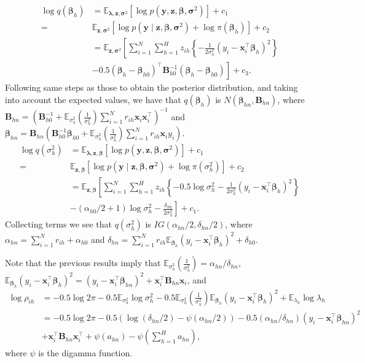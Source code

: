 \begin{enumerate}[leftmargin=*]
\begin{align*}
	\log q(\bm{\beta}_h)&=\mathbb{E}_{\bm{\lambda},\bm{z},\bm{\sigma}^2}\left[\log p(\bm{y},\bm{z},\bm{\beta},\bm{\sigma}^2)\right] + c_1\\
	=&\mathbb{E}_{\bm{z},\bm{\sigma}^2}\left[\log p(\bm{y}\mid\bm{z},\bm{\beta},\bm{\sigma}^2)+\log \pi(\bm{\beta}_h)\right] + c_2\\
	&=\mathbb{E}_{\bm{z},\bm{\sigma}^2}\left[\sum_{i=1}^N\sum_{h=1}^Hz_{ih}\left\{-\frac{1}{2\sigma^2_h}(y_i-\bm{x}_i^{\top}\bm{\beta}_h)^2\right\}\right.\\
	&\left. -0.5(\bm{\beta}_h-\bm{\beta}_{h0})^{\top}\bm{B}_{h0}^{-1}(\bm{\beta}_h-\bm{\beta}_{h0})\right]+c_3.
\end{align*}
Following same steps as those to obtain the posterior distribution, and taking into account the expected values, we have that $q(\bm{\beta}_h)$ is $N(\bm{\beta}_{hn},\bm{B}_{hn})$, where $\bm{B}_{hn}=\left(\bm{B}_{h0}^{-1}+\mathbb{E}_{\sigma_h^2}\left(\frac{1}{\sigma^2_h}\right)\sum_{i=1}^Nr_{ih}\bm{x}_i\bm{x}_i^{\top}\right)^{-1}$ and $\bm{\beta}_{hn}=\bm{B}_{hn}\left(\bm{B}_{h0}^{-1}\bm{\beta}_{h0}+\mathbb{E}_{\sigma_h^2}\left(\frac{1}{\sigma^2_h}\right)\sum_{i=1}^Nr_{ih}\bm{x}_iy_i\right)$.
\begin{align*}
	\log q(\sigma_h^2)&=\mathbb{E}_{\bm{\lambda},\bm{z},\bm{\beta}}\left[\log p(\bm{y},\bm{z},\bm{\beta},\bm{\sigma}^2)\right] + c_1\\
	=&\mathbb{E}_{\bm{z},\bm{\beta}}\left[\log p(\bm{y}\mid\bm{z},\bm{\beta},\bm{\sigma}^2)+\log \pi({\sigma}_h^2)\right] + c_2\\
	&=\mathbb{E}_{\bm{z},\bm{\beta}}\left[\sum_{i=1}^N\sum_{h=1}^H z_{ih}\left\{-0.5\log \sigma_h^2-\frac{1}{2\sigma_h^2}(y_i-\bm{x}_i^{\top}\bm{\beta}_h)^2\right\}\right.\\
	&\left.-(\alpha_{h0}/2+1)\log \sigma_h^2-\frac{\delta_{h0}}{2\sigma_h^2}\right]+c_1.
\end{align*}
Collecting terms we see that $q(\sigma_h^2)$ is $IG(\alpha_{hn}/2,\delta_{hn}/2)$, where $\alpha_{hn}=\sum_{i=1}^Nr_{ih}+\alpha_{h0}$ and $\delta_{hn}=\sum_{i=1}^N r_{ih}\mathbb{E}_{\bm{\beta}_h}(y_i-\bm{x}_i^{\top}\bm{\beta}_h)^2+\delta_{h0}$.

Note that the previous results imply that $\mathbb{E}_{\sigma_h^2}\left(\frac{1}{\sigma^2_h}\right)=\alpha_{hn}/\delta_{hn}$, $\mathbb{E}_{\bm{\beta}_h}(y_i-\bm{x}_i^{\top}\bm{\beta}_h)^2=(y_i-\bm{x}_i^{\top}\bm{\beta}_{hn})^2+\bm{x}_i^{\top}\bm{B}_{hn}\bm{x}_i$, and
\begin{align*}
	\log \rho_{ih}&=-0.5\log 2\pi -0.5\mathbb{E}_{\sigma^2_h} \log \sigma_h^2 - 0.5 \mathbb{E}_{\sigma^2_h}\left(\frac{1}{\sigma^2_h}\right)\mathbb{E}_{\bm{\beta}_h}(y_i-\bm{x}_i^{\top}\bm{\beta}_h)^2 + \mathbb{E}_{\lambda_h}\log \lambda_h\\
	&=-0.5\log 2\pi - 0.5(\log(\delta_{hn}/2)-\psi(\alpha_{hn}/2)) - 0.5(\alpha_{hn}/\delta_{hn})(y_i-\bm{x}_i^{\top}\bm{\beta}_{hn})^2\\
	&+\bm{x}_i^{\top}\bm{B}_{hn}\bm{x}_i^{\top} + \psi(a_{hn}) - \psi\left(\sum_{h=1}^Ha_{hn}\right),
\end{align*}
where $\psi$ is the digamma function.


\end{enumerate}
